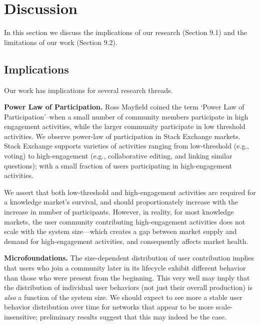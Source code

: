 \section{Discussion}
In this section we discuss the implications of our research (Section 9.1) and the limitations of our work (Section 9.2).

\subsection{Implications}
Our work has implications for several research threads.

\textbf{Power Law of Participation.} Ross Mayfield coined the term \lq Power Law of Participation\rq\---when a small number of community members participate in high engagement activities, while the larger community participate in low threshold activities. We observe power-law of participation in Stack Exchange markets. Stack Exchange supports varieties of activities ranging from low-threshold (e.g., voting) to high-engagement (e.g., collaborative editing, and linking similar questions); with a small fraction of users participating in high-engagement activities. 

We assert that both low-threshold and high-engagement activities are required for a knowledge market's survival, and should proportionately increase with the increase in number of participants. However, in reality, for most knowledge markets, the user community contributing high-engagement activities does not scale with the system size---which creates a gap between market supply and demand for high-engagement activities, and consequently affects market health. 



\textbf{Microfoundations.}
The size-dependent distribution of user contribution implies that users who join a community later in its lifecycle exhibit different behavior than those who were present from the beginning. This very well may imply that the distribution of individual user behaviors (not just their overall production) is \emph{also} a function of the system size. We should expect to see more a stable user behavior distribution over time for networks that appear to be more scale-insensitive; preliminary results suggest that this may indeed be the case.

